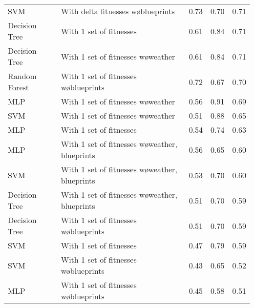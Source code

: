 \begin{tabular}{llrrr}
           SVM &             With delta fitnesses w\o blueprints &       0.73 &    0.70 & 0.71 \\
 Decision Tree &                         With 1 set of fitnesses &       0.61 &    0.84 & 0.71 \\
 Decision Tree &             With 1 set of fitnesses w\o weather &       0.61 &    0.84 & 0.71 \\
 Random Forest &          With 1 set of fitnesses w\o blueprints &       0.72 &    0.67 & 0.70 \\
           MLP &             With 1 set of fitnesses w\o weather &       0.56 &    0.91 & 0.69 \\
           SVM &             With 1 set of fitnesses w\o weather &       0.51 &    0.88 & 0.65 \\
           MLP &                         With 1 set of fitnesses &       0.54 &    0.74 & 0.63 \\
           MLP & With 1 set of fitnesses w\o weather, blueprints &       0.56 &    0.65 & 0.60 \\
           SVM & With 1 set of fitnesses w\o weather, blueprints &       0.53 &    0.70 & 0.60 \\
 Decision Tree & With 1 set of fitnesses w\o weather, blueprints &       0.51 &    0.70 & 0.59 \\
 Decision Tree &          With 1 set of fitnesses w\o blueprints &       0.51 &    0.70 & 0.59 \\
           SVM &                         With 1 set of fitnesses &       0.47 &    0.79 & 0.59 \\
           SVM &          With 1 set of fitnesses w\o blueprints &       0.43 &    0.65 & 0.52 \\
           MLP &          With 1 set of fitnesses w\o blueprints &       0.45 &    0.58 & 0.51 \\
\bottomrule
\end{tabular}
